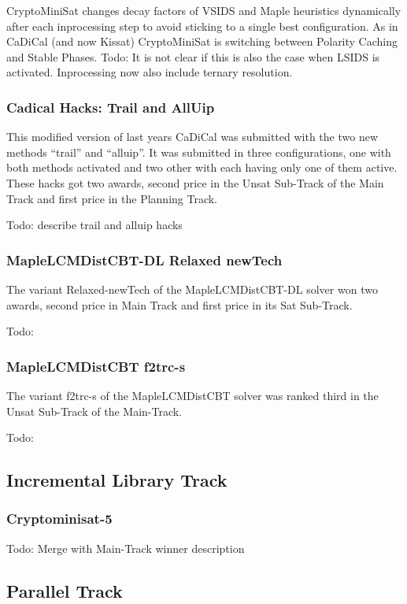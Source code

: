 \documentclass{elsarticle}
\newcommand{\todo}[1]{{\color{purple}Todo: #1}}
\begin{document}
CryptoMiniSat changes decay factors of VSIDS and Maple heuristics dynamically after each inprocessing step to avoid sticking to a single best configuration.
As in CaDiCal (and now Kissat) CryptoMiniSat is switching between Polarity Caching and Stable Phases. \todo{It is not clear if this is also the case when LSIDS is activated.}
Inprocessing now also include ternary resolution. 


\subsubsection{Cadical Hacks: Trail and AllUip}

This modified version of last years CaDiCal was submitted with the two new methods ``trail'' and ``alluip''. 
It was submitted in three configurations, one with both methods activated and two other with each having only one of them active. 
These hacks got two awards, second price in the Unsat Sub-Track of the Main Track and first price in the Planning Track. 

\todo{describe trail and alluip hacks}


\subsubsection{MapleLCMDistCBT-DL Relaxed newTech}

The variant Relaxed-newTech of the MapleLCMDistCBT-DL solver won two awards, second price in Main Track and first price in its Sat Sub-Track.

\todo{}

\subsubsection{MapleLCMDistCBT f2trc-s}

The variant f2trc-s of the MapleLCMDistCBT solver was ranked third in the Unsat Sub-Track of the Main-Track.

\todo{}


\subsection{Incremental Library Track}
\subsubsection{Cryptominisat-5}
\todo{Merge with Main-Track winner description}

\subsection{Parallel Track}
\end{document}
